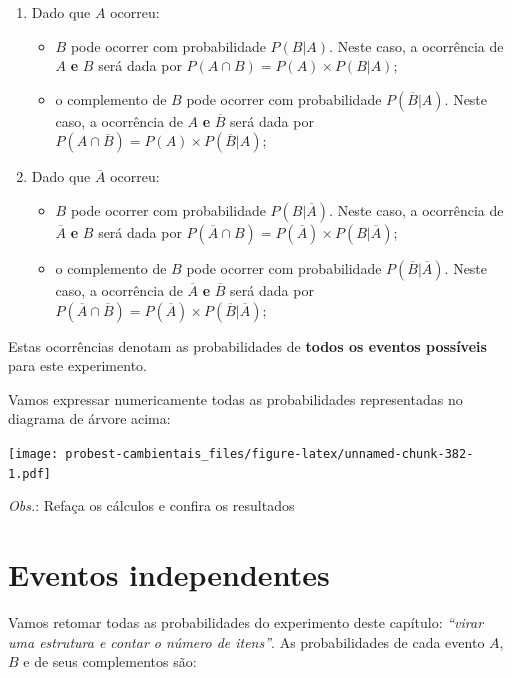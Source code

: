 \documentclass[
]{book}
\providecommand{\tightlist}{%
  \setlength{\itemsep}{0pt}\setlength{\parskip}{0pt}}
\begin{document}
\begin{enumerate}
\def\labelenumi{\arabic{enumi}.}
\tightlist
\item
  Dado que \(A\) ocorreu:

  \begin{itemize}
  \tightlist
  \item
    \(B\) pode ocorrer com probabilidade \(P(B|A)\). Neste caso, a ocorrência de \(A\) \textbf{e} \(B\) será dada por \(P(A \cap B) = P(A) \times P(B|A)\);
  \item
    o complemento de \(B\) pode ocorrer com probabilidade \(P(\overline{B}|A)\). Neste caso, a ocorrência de \(A\) \textbf{e} \(\overline{B}\) será dada por \(P(A \cap \overline{B}) = P(A) \times P(\overline{B}|A)\);
  \end{itemize}
\item
  Dado que \(\overline{A}\) ocorreu:

  \begin{itemize}
  \tightlist
  \item
    \(B\) pode ocorrer com probabilidade \(P(B|\overline{A})\). Neste caso, a ocorrência de \(\overline{A}\) \textbf{e} \(B\) será dada por \(P(\overline{A} \cap B) = P(\overline{A}) \times P(B|\overline{A})\);
  \item
    o complemento de \(B\) pode ocorrer com probabilidade \(P(\overline{B}|\overline{A})\). Neste caso, a ocorrência de \(\overline{A}\) \textbf{e} \(\overline{B}\) será dada por \(P(\overline{A} \cap \overline{B}) = P(\overline{A}) \times P(\overline{B}|\overline{A})\);
  \end{itemize}
\end{enumerate}

Estas ocorrências denotam as probabilidades de \textbf{todos os eventos possíveis} para este experimento.

Vamos expressar numericamente todas as probabilidades representadas no diagrama de árvore acima:

\texttt{[image: probest-cambientais\_files/figure-latex/unnamed-chunk-382-1.pdf]}

\emph{Obs.}: Refaça os cálculos e confira os resultados

\hypertarget{eventos-independentes}{%
\section{Eventos independentes}\label{eventos-independentes}}

Vamos retomar todas as probabilidades do experimento deste capítulo: \emph{``virar uma estrutura e contar o número de itens''}. As probabilidades de cada evento \(A\), \(B\) e de seus complementos são:
\end{document}
